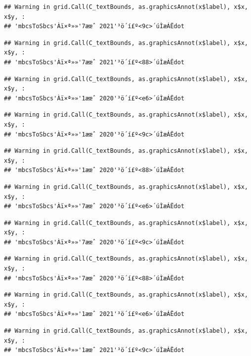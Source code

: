 \documentclass[
]{book}
\begin{document}
\begin{verbatim}
## Warning in grid.Call(C_textBounds, as.graphicsAnnot(x$label), x$x, x$y, :
## 'mbcsToSbcs'Àï×ª»»'7æœˆ 2021'³ö´í£º<9c>´úÌæÁËdot
\end{verbatim}

\begin{verbatim}
## Warning in grid.Call(C_textBounds, as.graphicsAnnot(x$label), x$x, x$y, :
## 'mbcsToSbcs'Àï×ª»»'7æœˆ 2021'³ö´í£º<88>´úÌæÁËdot
\end{verbatim}

\begin{verbatim}
## Warning in grid.Call(C_textBounds, as.graphicsAnnot(x$label), x$x, x$y, :
## 'mbcsToSbcs'Àï×ª»»'1æœˆ 2020'³ö´í£º<e6>´úÌæÁËdot
\end{verbatim}

\begin{verbatim}
## Warning in grid.Call(C_textBounds, as.graphicsAnnot(x$label), x$x, x$y, :
## 'mbcsToSbcs'Àï×ª»»'1æœˆ 2020'³ö´í£º<9c>´úÌæÁËdot
\end{verbatim}

\begin{verbatim}
## Warning in grid.Call(C_textBounds, as.graphicsAnnot(x$label), x$x, x$y, :
## 'mbcsToSbcs'Àï×ª»»'1æœˆ 2020'³ö´í£º<88>´úÌæÁËdot
\end{verbatim}

\begin{verbatim}
## Warning in grid.Call(C_textBounds, as.graphicsAnnot(x$label), x$x, x$y, :
## 'mbcsToSbcs'Àï×ª»»'7æœˆ 2020'³ö´í£º<e6>´úÌæÁËdot
\end{verbatim}

\begin{verbatim}
## Warning in grid.Call(C_textBounds, as.graphicsAnnot(x$label), x$x, x$y, :
## 'mbcsToSbcs'Àï×ª»»'7æœˆ 2020'³ö´í£º<9c>´úÌæÁËdot
\end{verbatim}

\begin{verbatim}
## Warning in grid.Call(C_textBounds, as.graphicsAnnot(x$label), x$x, x$y, :
## 'mbcsToSbcs'Àï×ª»»'7æœˆ 2020'³ö´í£º<88>´úÌæÁËdot
\end{verbatim}

\begin{verbatim}
## Warning in grid.Call(C_textBounds, as.graphicsAnnot(x$label), x$x, x$y, :
## 'mbcsToSbcs'Àï×ª»»'1æœˆ 2021'³ö´í£º<e6>´úÌæÁËdot
\end{verbatim}

\begin{verbatim}
## Warning in grid.Call(C_textBounds, as.graphicsAnnot(x$label), x$x, x$y, :
## 'mbcsToSbcs'Àï×ª»»'1æœˆ 2021'³ö´í£º<9c>´úÌæÁËdot
\end{verbatim}
\end{document}
